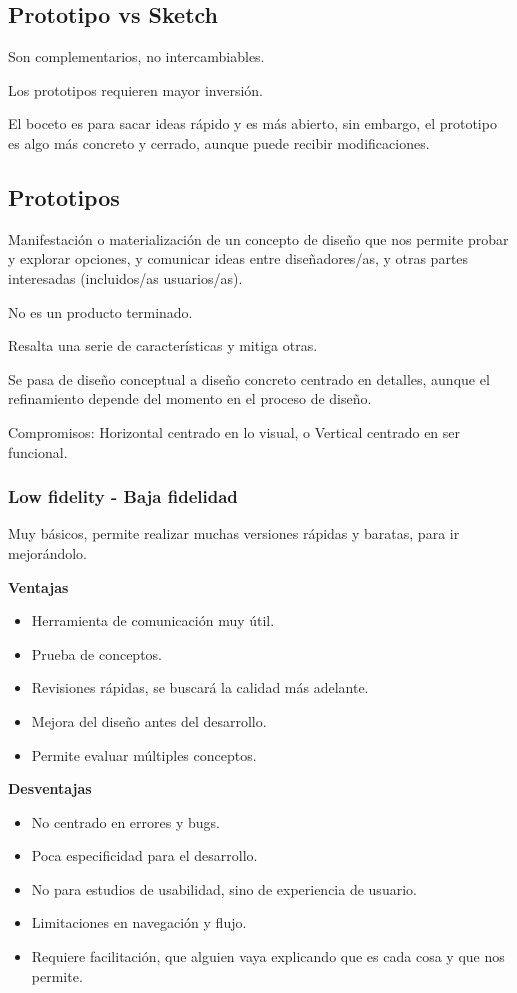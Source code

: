 \documentclass[12pt, twoside, openright]{report} %
\begin{document}
\subsection{Prototipo vs Sketch}
Son complementarios, no intercambiables.

Los prototipos requieren mayor inversión.

El boceto es para sacar ideas rápido y es más abierto, sin embargo, el prototipo es algo más concreto y cerrado, aunque puede recibir modificaciones.

\subsection{Prototipos}
Manifestación o materialización de un concepto de diseño que nos permite probar y explorar opciones, y comunicar ideas entre diseñadores/as, y otras partes interesadas (incluidos/as usuarios/as).

No es un producto terminado.

Resalta una serie de características y mitiga otras.

Se pasa de diseño conceptual a diseño concreto centrado en detalles, aunque el refinamiento depende del momento en el proceso de diseño.

Compromisos: Horizontal centrado en lo visual, o Vertical centrado en ser funcional.
\subsubsection{Low fidelity - Baja fidelidad}
Muy básicos, permite realizar muchas versiones rápidas y baratas, para ir mejorándolo.

\textbf{Ventajas}
\begin{itemize}
	\item Herramienta de comunicación muy útil.
	\item Prueba de conceptos.
	\item Revisiones rápidas, se buscará la calidad más adelante.
	\item Mejora del diseño antes del desarrollo.
	\item Permite evaluar múltiples conceptos.
\end{itemize}

\textbf{Desventajas}
\begin{itemize}
	\item No centrado en errores y bugs.
	\item Poca especificidad para el desarrollo.
	\item No para estudios de usabilidad, sino de experiencia de usuario.
	\item Limitaciones en navegación y flujo.
	\item Requiere facilitación, que alguien vaya explicando que es cada cosa y que nos permite.
\end{itemize}
\end{document}
